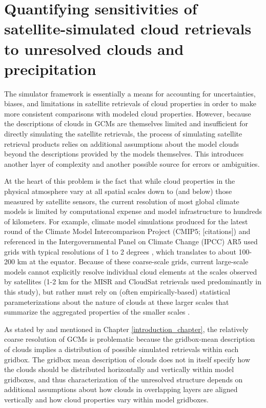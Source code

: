 \chapter{Quantifying sensitivities of satellite-simulated cloud retrievals to unresolved clouds and precipitation}\label{sg_chapter}

The simulator framework is essentially a means for accounting for uncertainties, biases, and limitations in satellite retrievals of cloud properties in order to make more consistent comparisons with modeled cloud properties. However, because the descriptions of clouds in GCMs are themselves limited and insufficient for directly simulating the satellite retrievals, the process of simulating satellite retrieval products relies on additional assumptions about the model clouds beyond the descriptions provided by the models themselves. This introduces another layer of complexity and another possible source for errors or ambiguities.

At the heart of this problem is the fact that while cloud properties in the physical atmosphere vary at all spatial scales down to (and below) those measured by satellite sensors, the current resolution of most global climate models is limited by computational expense and model infrastructure to hundreds of kilometers. For example, climate model simulations produced for the latest round of the Climate Model Intercomparison Project (CMIP5; [citations]) and referenced in the Intergovernmental Panel on Climate Change (IPCC) AR5 used grids with typical resolutions of 1 to 2 degrees \citep{flato_et_al_2013}, which translates to about 100-200 km at the equator. Because of these coarse-scale grids, current large-scale models cannot explicitly resolve individual cloud elements at the scales observed by satellites (1-2 km for the MISR and CloudSat retrievals used predominantly in this study), but rather must rely on (often empirically-based) statistical parameterizations about the nature of clouds at these larger scales that summarize the aggregated properties of the smaller scales \citep{randall_et_al_2003}.

As stated by \cite{pincus_et_al_2012} and mentioned in Chapter \ref{introduction_chapter}, the relatively coarse resolution of GCMs is problematic because the gridbox-mean description of clouds implies a distribution of possible simulated retrievals within each gridbox. The gridbox mean description of clouds does not in itself specify how the clouds should be distributed horizontally and vertically within model gridboxes, and thus characterization of the unresolved structure depends on additional assumptions about how clouds in overlapping layers are aligned vertically and how cloud properties vary within model gridboxes.

